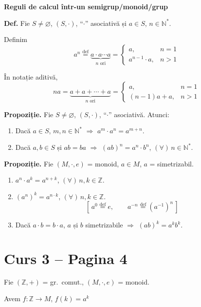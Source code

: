 \noindent\textbf{Reguli de calcul într-un semigrup/monoid/grup}

\noindent\textbf{Def.} Fie $S \neq \varnothing$, $(S,\cdot)$, ``$\cdot$'' asociativă și $a \in S$, $n \in \mathbb{N}^*$.

\noindent Definim
\[
a^n \overset{\text{def}}{=} \underbrace{a \cdot a \cdots a}_{n \text{ ori}} =
\begin{cases}
a, & n=1 \\
a^{n-1}\cdot a, & n>1
\end{cases}
\]

\noindent În notație aditivă,
\[
na = \underbrace{a+a+\cdots+a}_{n \text{ ori}} =
\begin{cases}
a, & n=1 \\
(n-1)a+a, & n>1
\end{cases}
\]

\noindent\textbf{Propoziție.} Fie $S \neq \varnothing$, $(S,\cdot)$, ``$\cdot$'' asociativă. Atunci:
\begin{enumerate}
\item[(1)] Dacă $a \in S$, $m,n \in \mathbb{N}^*$ $\Rightarrow$ $a^m \cdot a^n = a^{m+n}$.
\item[(2)] Dacă $a,b \in S$ și $ab=ba$ $\Rightarrow$ $(ab)^n = a^n \cdot b^n$, $(\forall)\, n \in \mathbb{N}^*$.
\end{enumerate}

\noindent\textbf{Propoziție.} Fie $(M,\cdot,e)$ = monoid, $a \in M$, $a$ = simetrizabil.
\begin{enumerate}
\item[(1)] $a^n \cdot a^k = a^{n+k}$, $(\forall)\, n,k \in \mathbb{Z}$.
\item[(2)] $(a^n)^k = a^{n\cdot k}$, $(\forall)\, n,k \in \mathbb{Z}$.
\[
\left[\, a^0 \overset{\text{def}}{=} e, \qquad a^{-n} \overset{\text{def}}{=} (a^{-1})^n \,\right]
\]
\item[(3)] Dacă $a\cdot b = b\cdot a$, $a$ și $b$ simetrizabile $\Rightarrow$ $(ab)^k = a^k b^k$.
\end{enumerate}






\section*{Curs 3 -- Pagina 4}

\noindent Fie $(\mathbb{Z},+)$ = gr.\ comut., $(M,\cdot,e)$ = monoid.

\noindent Avem $f : \mathbb{Z} \to M$, $f(k) = a^k$


